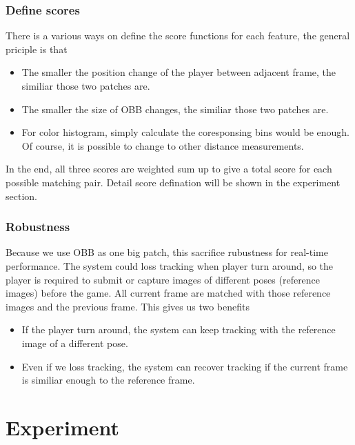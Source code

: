 \documentclass[11pt,twocolumn,letterpaper]{article}
\begin{document}
\subsubsection*{Define scores}
There is a various ways on define the score functions for each feature, the general priciple is that 
\begin{itemize}
\item The smaller the position change of the player between adjacent frame, the similiar those two patches are.
\item The smaller the size of OBB changes, the similiar those two patches are.
\item For color histogram, simply calculate the coresponsing bins would be enough. Of course, it is possible to change to other distance measurements.
\end{itemize}
\par
In the end, all three scores are weighted sum up to give a total score for each possible matching pair. Detail score defination will be shown in the experiment section.
\subsubsection*{Robustness}
Because we use OBB as one big patch, this sacrifice rubustness for real-time performance. The system could loss tracking when player turn around, so the player is required to submit or capture images of different poses (reference images) before the game. All current frame are matched with those reference images and the previous frame. This gives us two benefits
\begin{itemize}
\item If the player turn around, the system can keep tracking with the reference image of a different pose.
\item Even if we loss tracking, the system can recover tracking if the current frame is similiar enough to the reference frame.
\end{itemize}
\section{Experiment}
\end{document}
